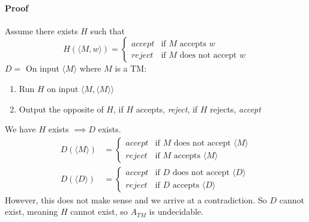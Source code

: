 \documentclass[12 pt]{article}
\begin{document}
\paragraph{Proof} Assume there exists $H$ such that
$$H(\langle M,w \rangle) =
\begin{cases}
  \textit{accept} & \text{if } M \text{ accepts }w\\
  \textit{reject} & \text{if } M \text{ does not accept }w
\end{cases}
$$
$D = $ On input $\langle M \rangle$ where $M$ is a TM:
\begin{enumerate}
\item Run $H$ on input $\langle M,\langle M \rangle \rangle$
\item Output the opposite of $H$, if $H$ accepts, \textit{reject}, if
  $H$ rejects, \textit{accept}
\end{enumerate}
We have $H$ exists $\implies D$ exists.
\begin{align*}
  D(\langle M \rangle) & =
\begin{cases}
  \textit{accept} & \text{if } M \text{ does not accept }\langle M \rangle\\
  \textit{reject} & \text{if } M \text{ accepts }\langle M \rangle
\end{cases}
  \\
  D(\langle D \rangle) & =
\begin{cases}
  \textit{accept} & \text{if } D \text{ does not accept }\langle D \rangle\\
  \textit{reject} & \text{if } D \text{ accepts }\langle D \rangle
\end{cases}
\end{align*}
However, this does not make sense and we arrive at a contradiction. So
$D$ cannot exist, meaning $H$ cannot exist, so $A_{TM}$ is undecidable.
\end{document}
